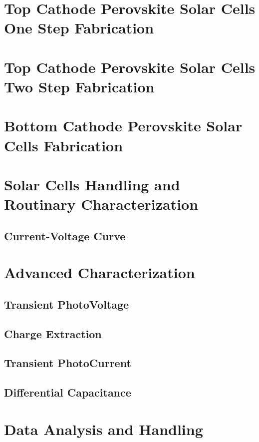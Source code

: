 \section{Top Cathode Perovskite Solar Cells One Step Fabrication}

\section{Top Cathode Perovskite Solar Cells Two Step Fabrication}

\section{Bottom Cathode Perovskite Solar Cells Fabrication}

\section{Solar Cells Handling and Routinary Characterization}

	\subsection{Current-Voltage Curve}

\section{Advanced Characterization}

	\subsection{Transient PhotoVoltage}
	
	\subsection{Charge Extraction}
	
	\subsection{Transient PhotoCurrent}
	
	\subsection{Differential Capacitance}
	
\section{Data Analysis and Handling}



